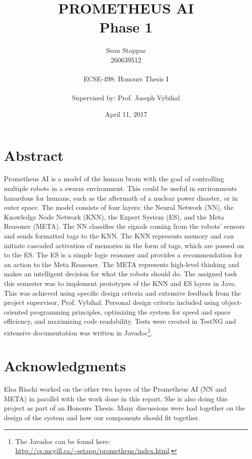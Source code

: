 \documentclass[titlepage,11pt]{article}
\title
{
	\uppercase{Prometheus AI} \\
	\large Phase 1
}
\author %
{
	Sean Stappas \\ 
	260639512 \\
	\\ 
	ECSE-498: Honours Thesis I \\
	\\
	\small Supervised by: Prof. Joseph Vybihal
}
\date{April 11, 2017}
\begin{document}
	
\sloppy

\maketitle

\section*{Abstract}
Prometheus AI is a model of the human brain with the goal of controlling multiple robots in a swarm environment. This could be useful in environments hazardous for humans, such as the aftermath of a nuclear power disaster, or in outer space. The model consists of four layers: the Neural Network (NN), the Knowledge Node Network (KNN), the Expert System (ES), and the Meta Reasoner (META). The NN classifies the signals coming from the robots' sensors and sends formatted tags to the KNN. The KNN represents memory and can initiate cascaded activation of memories in the form of tags, which are passed on to the ES. The ES is a simple logic reasoner and provides a recommendation for an action to the Meta Reasoner. The META represents high-level thinking and makes an intelligent decision for what the robots should do. The assigned task this semester was to implement prototypes of the KNN and ES layers in Java. This was achieved using specific design criteria and extensive feedback from the project supervisor, Prof. Vybihal. Personal design criteria included using object-oriented programming principles, optimizing the system for speed and space efficiency, and maximizing code readability. Tests were created in TestNG and extensive documentation was written in Javadoc\footnote{The Javadoc can be found here: \url{http://cs.mcgill.ca/~sstapp/prometheus/index.html}.}.

\section*{Acknowledgments}
Elsa Riachi worked on the other two layers of the Prometheus AI (NN and META) in parallel with the work done in this report. She is also doing this project as part of an Honours Thesis. Many discussions were had together on the design of the system and how our components should fit together.
\end{document}
